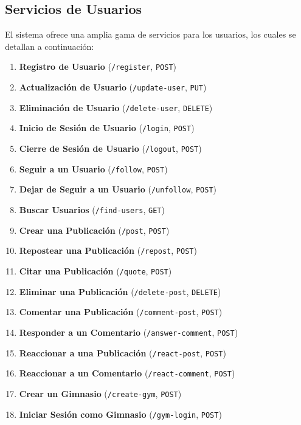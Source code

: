 \documentclass{article}
\begin{document}
\subsection{Servicios de Usuarios}

El sistema ofrece una amplia gama de servicios para los usuarios, los cuales se detallan a continuación:

\begin{enumerate}
    \item \textbf{Registro de Usuario} (\texttt{/register}, \texttt{POST})
    \item \textbf{Actualización de Usuario} (\texttt{/update-user}, \texttt{PUT})
    \item \textbf{Eliminación de Usuario} (\texttt{/delete-user}, \texttt{DELETE})
    \item \textbf{Inicio de Sesión de Usuario} (\texttt{/login}, \texttt{POST})
    \item \textbf{Cierre de Sesión de Usuario} (\texttt{/logout}, \texttt{POST})
    \item \textbf{Seguir a un Usuario} (\texttt{/follow}, \texttt{POST})
    \item \textbf{Dejar de Seguir a un Usuario} (\texttt{/unfollow}, \texttt{POST})
    \item \textbf{Buscar Usuarios} (\texttt{/find-users}, \texttt{GET})
    \item \textbf{Crear una Publicación} (\texttt{/post}, \texttt{POST})
    \item \textbf{Repostear una Publicación} (\texttt{/repost}, \texttt{POST})
    \item \textbf{Citar una Publicación} (\texttt{/quote}, \texttt{POST})
    \item \textbf{Eliminar una Publicación} (\texttt{/delete-post}, \texttt{DELETE})
    \item \textbf{Comentar una Publicación} (\texttt{/comment-post}, \texttt{POST})
    \item \textbf{Responder a un Comentario} (\texttt{/answer-comment}, \texttt{POST})
    \item \textbf{Reaccionar a una Publicación} (\texttt{/react-post}, \texttt{POST})
    \item \textbf{Reaccionar a un Comentario} (\texttt{/react-comment}, \texttt{POST})
    \item \textbf{Crear un Gimnasio} (\texttt{/create-gym}, \texttt{POST})
    \item \textbf{Iniciar Sesión como Gimnasio} (\texttt{/gym-login}, \texttt{POST})

\end{enumerate}
\end{document}
